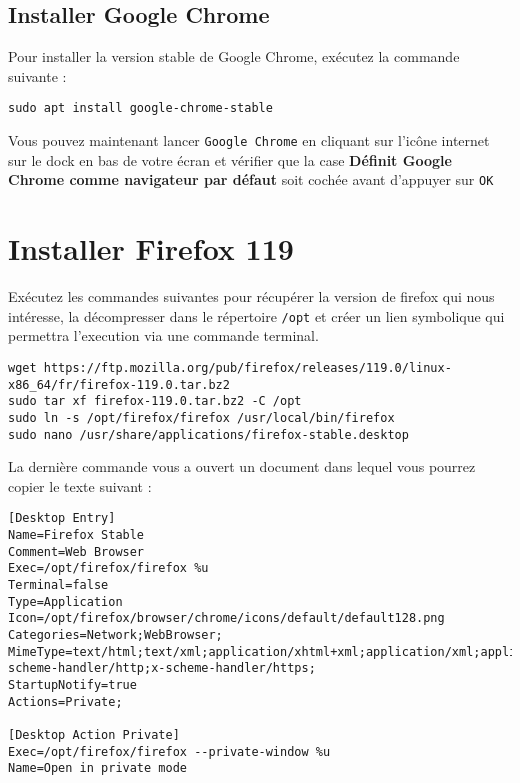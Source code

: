 \subsection{Installer Google Chrome}

Pour installer la version stable de Google Chrome, exécutez la commande suivante :

\begin{lstlisting}
sudo apt install google-chrome-stable
\end{lstlisting}

Vous pouvez maintenant lancer \texttt{Google Chrome} en cliquant sur l'icône internet sur le dock en bas de votre écran et vérifier que la case \textbf{Définit Google Chrome comme navigateur par défaut} soit cochée avant d'appuyer sur \texttt{OK}

\section{Installer Firefox 119}

Exécutez les commandes suivantes pour récupérer la version de firefox qui nous intéresse, la décompresser dans le répertoire \texttt{/opt} et créer un lien symbolique qui permettra l'execution via une commande terminal.

\begin{lstlisting}
wget https://ftp.mozilla.org/pub/firefox/releases/119.0/linux-x86_64/fr/firefox-119.0.tar.bz2
sudo tar xf firefox-119.0.tar.bz2 -C /opt
sudo ln -s /opt/firefox/firefox /usr/local/bin/firefox
sudo nano /usr/share/applications/firefox-stable.desktop
\end{lstlisting}

La dernière commande vous a ouvert un document dans lequel vous pourrez copier le texte suivant :

\begin{lstlisting}[style=tf]
[Desktop Entry]
Name=Firefox Stable
Comment=Web Browser
Exec=/opt/firefox/firefox %u
Terminal=false
Type=Application
Icon=/opt/firefox/browser/chrome/icons/default/default128.png
Categories=Network;WebBrowser;
MimeType=text/html;text/xml;application/xhtml+xml;application/xml;application/vnd.mozilla.xul+xml;application/rss+xml;application/rdf+xml;image/gif;image/jpeg;image/png;x-scheme-handler/http;x-scheme-handler/https;
StartupNotify=true
Actions=Private;

[Desktop Action Private]
Exec=/opt/firefox/firefox --private-window %u
Name=Open in private mode
\end{lstlisting}

